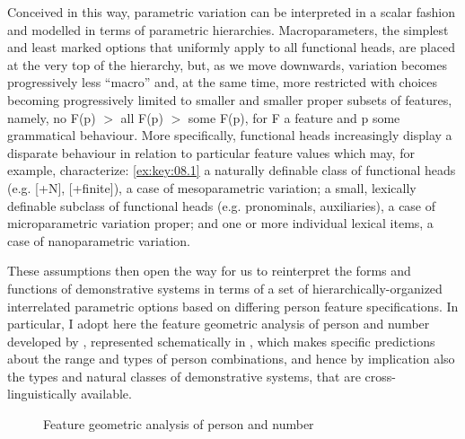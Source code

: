 \documentclass[output=paper]{langsci/langscibook}
\begin{document}
Conceived in this way, parametric variation can be interpreted in a scalar
fashion and modelled in terms of parametric hierarchies. Macroparameters, the
simplest and least marked options that uniformly apply to all functional heads,
are placed at the very top of the hierarchy, but, as we move downwards,
variation becomes progressively less \enquote{macro} and, at the same time,
more restricted with choices becoming progressively limited to smaller and
smaller proper subsets of features, namely, no F(p) $>$ all F(p) $>$ some F(p),
for F a feature and p some grammatical behaviour. More specifically, functional
heads increasingly display a disparate behaviour in relation to particular
feature values which may, for example, characterize: \eqref{ex:key:08.1} a
naturally definable class of functional heads (e.g. [+N],
[+finite]), a case of mesoparametric variation;  a small,
lexically definable subclass of functional heads (e.g.
pronominals, auxiliaries), a case of microparametric variation
proper; and  one or more individual lexical items, a case of
nanoparametric variation.

These assumptions then open the way for us to reinterpret the forms and
functions of  demonstrative systems in terms of a set of
hierarchically-organized interrelated parametric options based on differing
person feature specifications. In particular, I adopt here the feature
geometric analysis of person and number developed by \citet{HarRit2002},
represented schematically in , which makes specific
predictions about the range and types of person combinations, and hence by
implication also the types and natural classes of demonstrative systems, that
are cross-linguistically available.

\begin{figure}
    \centering\caption{Feature geometric analysis of person and number
    \parencite{HarRit2002}}\label{fig:key:2}
\end{figure}
\end{document}
